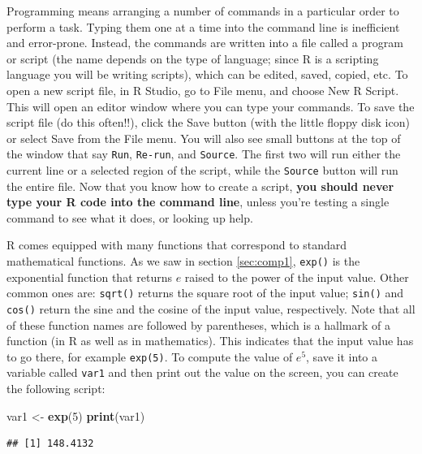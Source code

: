 \documentclass[
]{book}
\newenvironment{Shaded}{\begin{snugshade}}{\end{snugshade}}
\newcommand{\DecValTok}[1]{\textcolor[rgb]{0.00,0.00,0.81}{#1}}
\newcommand{\KeywordTok}[1]{\textcolor[rgb]{0.13,0.29,0.53}{\textbf{#1}}}
\newcommand{\NormalTok}[1]{#1}
\newcommand{\StringTok}[1]{\textcolor[rgb]{0.31,0.60,0.02}{#1}}
\begin{document}
Programming means arranging a number of commands in a particular order to perform a task. Typing them one at a time into the command line is inefficient and error-prone. Instead, the commands are written into a file called a program or script (the name depends on the type of language; since R is a scripting language you will be writing scripts), which can be edited, saved, copied, etc. To open a new script file, in R Studio, go to File menu, and choose New R Script. This will open an editor window where you can type your commands. To save the script file (do this often!!), click the Save button (with the little floppy disk icon) or select Save from the File menu. You will also see small buttons at the top of the window that say \texttt{Run}, \texttt{Re-run}, and \texttt{Source}. The first two will run either the current line or a selected region of the script, while the \texttt{Source} button will run the entire file. Now that you know how to create a script, \textbf{you should never type your R code into the command line}, unless you're testing a single command to see what it does, or looking up help.

R comes equipped with many   functions that correspond to standard mathematical functions. As we saw in section \ref{sec:comp1}, \texttt{exp()} is the exponential function that returns \(e\) raised to the power of the input value. Other common ones are: \texttt{sqrt()} returns the square root of the input value; \texttt{sin()} and \texttt{cos()} return the sine and the cosine of the input value, respectively. Note that all of these function names are followed by parentheses, which is a hallmark of a function (in R as well as in mathematics). This indicates that the input value has to go there, for example \texttt{exp(5)}. To compute the value of \(e^5\), save it into a variable called \texttt{var1} and then print out the value on the screen, you can create the following script:

\begin{Shaded}
\begin{Highlighting}[]
\NormalTok{var1 \textless{}{-}}\StringTok{ }\KeywordTok{exp}\NormalTok{(}\DecValTok{5}\NormalTok{)}
\KeywordTok{print}\NormalTok{(var1)}
\end{Highlighting}
\end{Shaded}

\begin{verbatim}
## [1] 148.4132
\end{verbatim}
\end{document}
